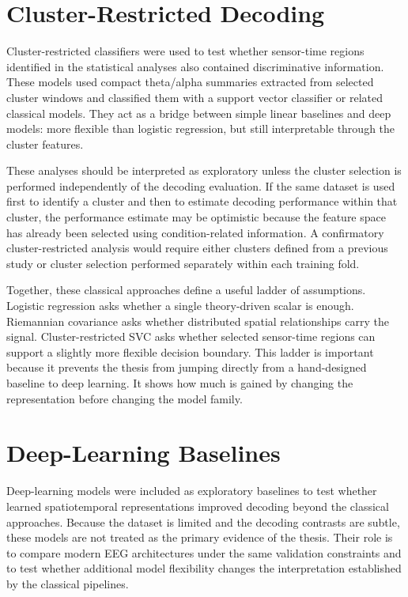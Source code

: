 \documentclass[11pt,a4paper,chapterprefix=false,parskip=false]{scrreprt}
\begin{document}
\section{Cluster-Restricted Decoding}
Cluster-restricted classifiers were used to test whether sensor-time regions identified in the statistical analyses also contained discriminative information. These models used compact theta/alpha summaries extracted from selected cluster windows and classified them with a support vector classifier or related classical models. They act as a bridge between simple linear baselines and deep models: more flexible than logistic regression, but still interpretable through the cluster features.

These analyses should be interpreted as exploratory unless the cluster selection is performed independently of the decoding evaluation. If the same dataset is used first to identify a cluster and then to estimate decoding performance within that cluster, the performance estimate may be optimistic because the feature space has already been selected using condition-related information. A confirmatory cluster-restricted analysis would require either clusters defined from a previous study or cluster selection performed separately within each training fold.

Together, these classical approaches define a useful ladder of assumptions. Logistic regression asks whether a single theory-driven scalar is enough. Riemannian covariance asks whether distributed spatial relationships carry the signal. Cluster-restricted SVC asks whether selected sensor-time regions can support a slightly more flexible decision boundary. This ladder is important because it prevents the thesis from jumping directly from a hand-designed baseline to deep learning. It shows how much is gained by changing the representation before changing the model family.

\section{Deep-Learning Baselines}
Deep-learning models were included as exploratory baselines to test whether learned spatiotemporal representations improved decoding beyond the classical approaches. Because the dataset is limited and the decoding contrasts are subtle, these models are not treated as the primary evidence of the thesis. Their role is to compare modern EEG architectures under the same validation constraints and to test whether additional model flexibility changes the interpretation established by the classical pipelines.
\end{document}
